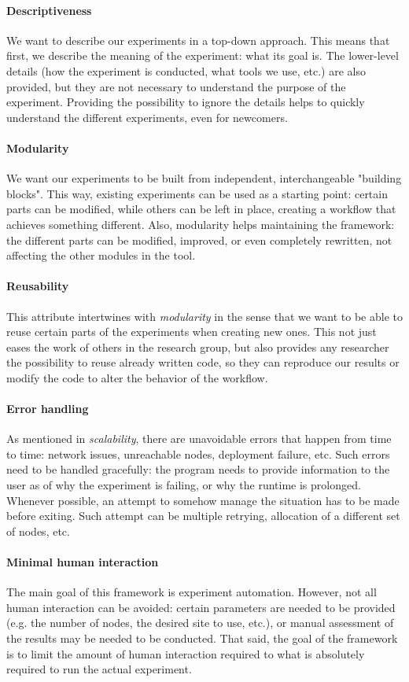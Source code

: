 \paragraph{Descriptiveness}
We want to describe our experiments in a top-down approach. This means
that first, we describe the meaning of the experiment: what its goal
is. The lower-level details (how the experiment is conducted, what
tools we use, etc.) are also provided, but they are not necessary to
understand the purpose of the experiment. Providing the possibility to
ignore the details helps to quickly understand the different
experiments, even for newcomers.
\paragraph{Modularity}
We want our experiments to be built from independent, interchangeable
"building blocks". This way, existing experiments can be used as a
starting point: certain parts can be modified, while others can be
left in place, creating a workflow that achieves something
different. Also, modularity helps maintaining the framework: the
different parts can be modified, improved, or even completely
rewritten, not affecting the other modules in the tool.
\paragraph{Reusability}
This attribute intertwines with \emph{modularity} in the sense that we
want to be able to reuse certain parts of the experiments when
creating new ones. This not just eases the work of others in the
research group, but also provides any researcher the possibility to
reuse already written code, so they can reproduce our results or
modify the code to alter the behavior of the workflow.
\paragraph{Error handling}
As mentioned in \emph{scalability}, there are unavoidable errors that
happen from time to time: network issues, unreachable nodes,
deployment failure, etc. Such errors need to be handled gracefully:
the program needs to provide information to the user as of why the
experiment is failing, or why the runtime is prolonged. Whenever
possible, an attempt to somehow manage the situation has to be made
before exiting. Such attempt can be multiple retrying, allocation of
a different set of nodes, etc.
\paragraph{Minimal human interaction}
The main goal of this framework is experiment automation. However,
not all human interaction can be avoided: certain parameters are
needed to be provided (e.g. the number of nodes, the desired site to
use, etc.), or manual assessment of the results may be needed to be
conducted. That said, the goal of the framework is to limit the
amount of human interaction required to what is absolutely required to
run the actual experiment.
